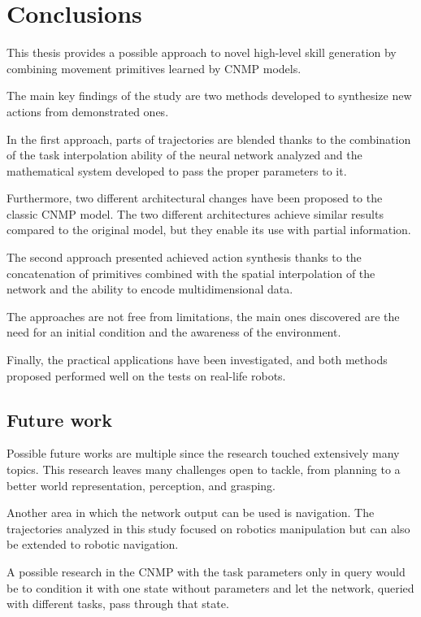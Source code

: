 \chapter{Conclusions}
\label{chap:conclusions}

This thesis provides a possible approach to novel high-level skill generation by combining movement primitives learned by CNMP models. 

The main key findings of the study are two methods developed to synthesize new actions from demonstrated ones. 

In the first approach, parts of trajectories are blended thanks to the combination of the task interpolation ability of the neural network analyzed and the mathematical system developed to pass the proper parameters to it.  

Furthermore, two different architectural changes have been proposed to the classic CNMP model. The two different architectures achieve similar results compared to the original model, but they enable its use with partial information. 

The second approach presented achieved action synthesis thanks to the concatenation of primitives combined with the spatial interpolation of the network and the ability to encode multidimensional data.

The approaches are not free from limitations, the main ones discovered are the need for an initial condition and the awareness of the environment.  

Finally, the practical applications have been investigated, and both methods proposed performed well on the tests on real-life robots. 

\section{Future work}
Possible future works are multiple since the research touched extensively many topics. 
This research leaves many challenges open to tackle, from planning to a better world representation, perception, and grasping.

Another area in which the network output can be used is navigation. The trajectories analyzed in this study focused on robotics manipulation but can also be extended to robotic navigation.

A possible research in the CNMP with the task parameters only in query would be to condition it with one state without parameters and let the network, queried with different tasks, pass through that state.


